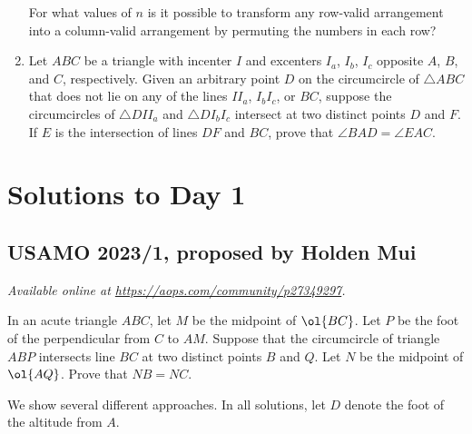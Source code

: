 \documentclass[11pt]{scrartcl}
\begin{document}
\begin{enumerate}[\bfseries 1.]
For what values of $n$ is it possible to transform any row-valid arrangement
into a column-valid arrangement by permuting the numbers in each row?

\item %
Let $ABC$ be a triangle with incenter $I$
and excenters $I_a$, $I_b$, $I_c$ opposite $A$, $B$, and $C$, respectively.
Given an arbitrary point $D$ on the circumcircle of $\triangle ABC$
that does not lie on any of the lines $II_a$, $I_bI_c$, or $BC$,
suppose the circumcircles of $\triangle DII_a$ and $\triangle DI_bI_c$
intersect at two distinct points $D$ and $F$.
If $E$ is the intersection of lines $DF$ and $BC$,
prove that $\angle BAD = \angle EAC$.

\end{enumerate}
\pagebreak

\section{Solutions to Day 1}
\subsection{USAMO 2023/1, proposed by Holden Mui}
\textsl{Available online at \url{https://aops.com/community/p27349297}.}
\begin{mdframed}[style=mdpurplebox,frametitle={Problem statement}]
In an acute triangle $ABC$, let $M$ be the midpoint of $\ol{BC}$.
Let $P$ be the foot of the perpendicular from $C$ to $AM$.
Suppose that the circumcircle of triangle $ABP$
intersects line $BC$ at two distinct points $B$ and $Q$.
Let $N$ be the midpoint of $\ol{AQ}$.
Prove that $NB = NC$.
\end{mdframed}
We show several different approaches.
In all solutions, let $D$ denote the foot of the altitude from $A$.
\end{document}
